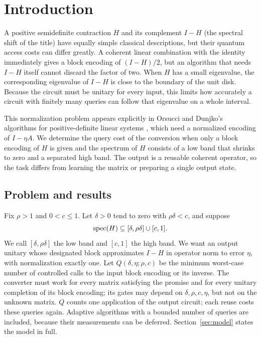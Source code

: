 \section{Introduction}\label{sec:introduction}
A positive semidefinite contraction $H$ and its complement $I-H$ (the spectral shift of the title) have equally simple classical descriptions, but their quantum access costs can differ greatly. A coherent linear combination with the identity immediately gives a block encoding of $(I-H)/2$, but an algorithm that needs $I-H$ itself cannot discard the factor of two. When $H$ has a small eigenvalue, the corresponding eigenvalue of $I-H$ is close to the boundary of the unit disk. Because the circuit must be unitary for every input, this limits how accurately a circuit with finitely many queries can follow that eigenvalue on a whole interval.

This normalization problem appears explicitly in Orsucci and Dunjko's algorithms for positive-definite linear systems \cite[Section 4.3]{orsucci2021}, which need a normalized encoding of $I-\eta A$. We determine the query cost of the conversion when only a block encoding of $H$ is given and the spectrum of $H$ consists of a low band that shrinks to zero and a separated high band. The output is a reusable coherent operator, so the task differs from learning the matrix or preparing a single output state.

\subsection{Problem and results}
Fix $\rho>1$ and $0<c\leq1$. Let $\delta>0$ tend to zero with $\rho\delta<c$, and suppose
\[
 \operatorname{spec}(H)\subseteq[\delta,\rho\delta]\cup[c,1].
\]
We call $[\delta,\rho\delta]$ the low band and $[c,1]$ the high band. We want an output unitary whose designated block approximates $I-H$ in operator norm to error $\eta$, with normalization exactly one. Let $Q(\delta,\eta;\rho,c)$ be the minimum worst-case number of controlled calls to the input block encoding or its inverse. The converter must work for every matrix satisfying the promise and for every unitary completion of its block encoding; its gates may depend on $\delta,\rho,c,\eta$, but not on the unknown matrix. $Q$ counts one application of the output circuit; each reuse costs these queries again. Adaptive algorithms with a bounded number of queries are included, because their measurements can be deferred. Section~\ref{sec:model} states the model in full.

